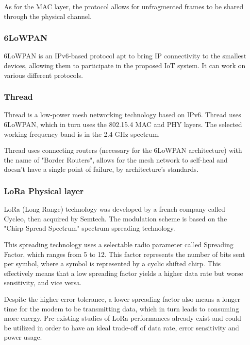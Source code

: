 \documentclass[11pt]{article}
\begin{document}
As for the MAC layer, the protocol allows for unfragmented frames to be shared through the physical channel.

\subsubsection{6LoWPAN}

6LoWPAN is an IPv6-based protocol apt to bring IP connectivity to the smallest devices, allowing them to participate in the proposed IoT system. It can work on various different protocols. 
\par
\vspace{0.5 cm}

\subsubsection{Thread}

Thread is a low-power mesh networking technology based on IPv6. Thread uses 6LoWPAN, which in turn uses the 802.15.4 MAC and PHY layers. The selected working frequency band is in the 2.4 GHz spectrum. \par \vspace{0.5 cm}

Thread uses connecting routers (necessary for the 6LoWPAN architecture) with the name of "Border Routers", allows for the mesh network to self-heal and doesn't have a single point of failure, by architecture's standards. 

\subsubsection{LoRa Physical layer}
LoRa (Long Range) technology was developed by a french company called Cycleo, then acquired by Semtech. The modulation scheme is based on the "Chirp Spread Spectrum" spectrum spreading technology. \par \vspace{0.5 cm}

This spreading technology uses a selectable radio parameter called Spreading Factor, which ranges from 5 to 12. This factor represents the number of bits sent per symbol, where a symbol is represented by a cyclic shifted chirp. This effectively means that a low spreading factor yields a higher data rate but worse sensitivity, and vice versa. \par \vspace{0.5 cm}

Despite the higher error tolerance, a lower spreading factor also means a longer time for the modem to be transmitting data, which in turn leads to consuming more energy. Pre-existing studies of LoRa performances already exist and could be utilized in order to have an ideal trade-off of data rate, error sensitivity and power usage. \par \vspace{0.5 cm}
\end{document}

